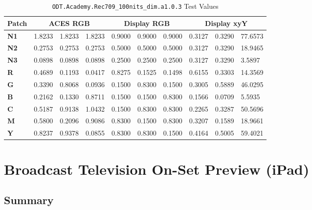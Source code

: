 \begin{table}[ht!]
    \centering
    \begin{tabular}{|l|l|l|l|l|l|l|l|l|l|}
        \hline
        \multicolumn{1}{|c|}{\textbf{Patch}} & \multicolumn{3}{c|}{\textbf{ACES RGB}} & \multicolumn{3}{c|}{\textbf{Display RGB}} & \multicolumn{3}{c|}{\textbf{Display xyY}} \\ \hline
        \textbf{N1} & 1.8233 & 1.8233 & 1.8233 & 0.9000 & 0.9000 & 0.9000 & 0.3127 & 0.3290 & 77.6573 \\ \hline
        \textbf{N2} & 0.2753 & 0.2753 & 0.2753 & 0.5000 & 0.5000 & 0.5000 & 0.3127 & 0.3290 & 18.9465 \\ \hline
        \textbf{N3} & 0.0898 & 0.0898 & 0.0898 & 0.2500 & 0.2500 & 0.2500 & 0.3127 & 0.3290 & 3.5897  \\ \hline
        \textbf{R}  & 0.4689 & 0.1193 & 0.0417 & 0.8275 & 0.1525 & 0.1498 & 0.6155 & 0.3303 & 14.3569 \\ \hline
        \textbf{G}  & 0.3390 & 0.8068 & 0.0936 & 0.1500 & 0.8300 & 0.1500 & 0.3005 & 0.5889 & 46.0295 \\ \hline
        \textbf{B}  & 0.2162 & 0.1330 & 0.8711 & 0.1500 & 0.1500 & 0.8300 & 0.1566 & 0.0709 & 5.5935  \\ \hline
        \textbf{C}  & 0.5187 & 0.9138 & 1.0432 & 0.1500 & 0.8300 & 0.8300 & 0.2265 & 0.3287 & 50.5696 \\ \hline
        \textbf{M}  & 0.5800 & 0.2096 & 0.9086 & 0.8300 & 0.1500 & 0.8300 & 0.3207 & 0.1589 & 18.9661 \\ \hline
        \textbf{Y}  & 0.8237 & 0.9378 & 0.0855 & 0.8300 & 0.8300 & 0.1500 & 0.4164 & 0.5005 & 59.4021 \\ \hline
    \end{tabular}
    \caption{ \texttt{ODT.Academy.Rec709\_100nits\_dim.a1.0.3} Test Values}
    \label{tab:testValues-rec709onset}
\end{table}

\clearpage
\section{Broadcast Television On-Set Preview (iPad)}
\label{sec:ot-app-iPad-d60}

\subsection{Summary}
\label{subsec:summary-iPad-d60}

